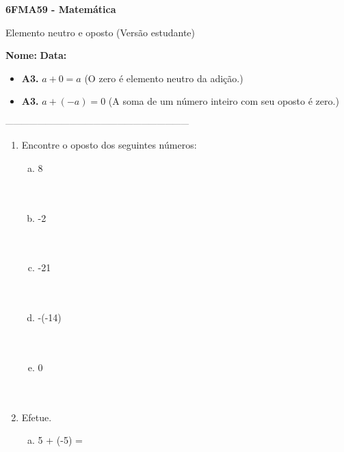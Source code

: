 \documentclass[a4paper,14pt]{article}
\begin{document}
	
	\noindent\textbf{6FMA59 - Matemática} 
	
	\begin{center}Elemento neutro e oposto (Versão estudante)
	\end{center}
	
	\noindent\textbf{Nome:} \underline{\hspace{10cm}}
	\noindent\textbf{Data:} \underline{\hspace{4cm}}
	
	\begin{multicols}{2}
    		\noindent 
    		\begin{itemize}
    			\item \textbf{A3.} $a + 0 = a$ (O zero é elemento neutro da adição.)
    			\item \textbf{A3.} $a + (-a) = 0$ (A soma de um número inteiro com seu oposto é zero.)
    		\end{itemize}
    		\textsubscript{---------------------------------------------------------------------}
    		\begin{enumerate}
    			\item Encontre o oposto dos seguintes números:
    			\begin{enumerate}[a)]
    				\item 8 \\\\\\
    				\item -2 \\\\\\
    				\item -21 \\\\\\
    				\item -(-14) \\\\\\
    				\item 0 \\\\\\
    			\end{enumerate}
    			\item Efetue.
    			\begin{enumerate}[a)]
    				\item 5 + (-5) = \\

\end{enumerate}
\end{enumerate}
\end{multicols}
\end{document}
